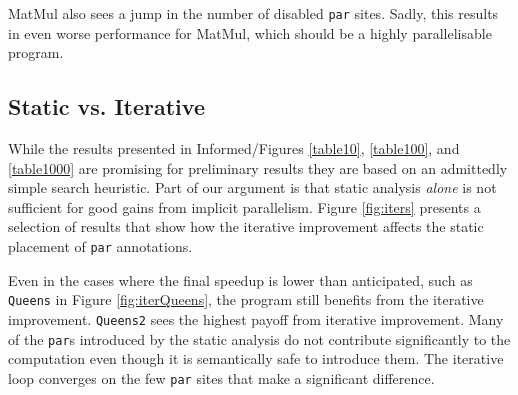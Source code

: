 MatMul also sees a jump in the number of disabled \verb-par- sites. Sadly, this
results in even worse performance for MatMul, which should be a highly
parallelisable program.

\subsection*{Static vs. Iterative}

While the results presented in Informed/Figures \ref{table10}, \ref{table100}, and
\ref{table1000} are promising for preliminary results they are based on an
admittedly simple search heuristic. Part of our argument is that static analysis
\emph{alone} is not sufficient for good gains from implicit parallelism. Figure
\ref{fig:iters} presents a selection of results that show how the iterative
improvement affects the static placement of \verb-par- annotations.

Even in the cases where the final speedup is lower than anticipated, such as
\texttt{Queens} in Figure \ref{fig:iterQueens}, the program still benefits from the
iterative improvement. \texttt{Queens2} sees the highest payoff from iterative
improvement. Many of the \verb-par-s introduced by the static analysis
do not contribute significantly to the computation even though it is
semantically safe to introduce them. The iterative loop converges on the few
\verb-par- sites that make a significant difference.

